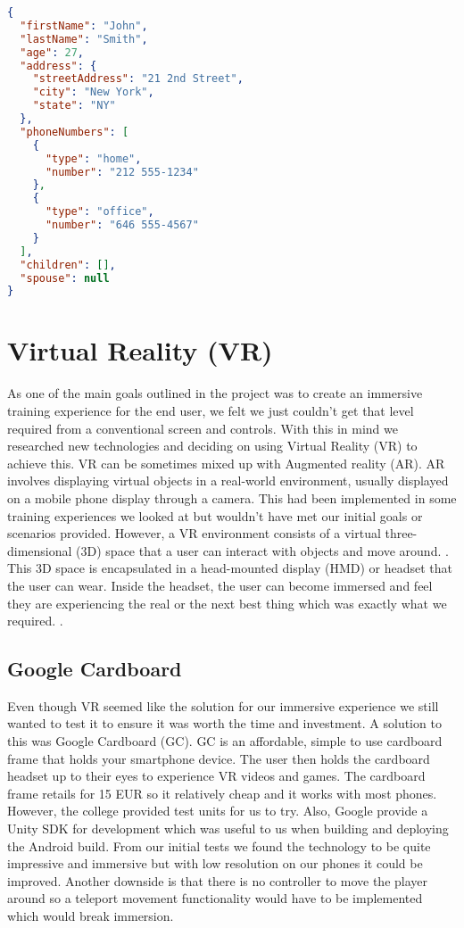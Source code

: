 \begin{lstlisting}[language=JSON]
{
  "firstName": "John",
  "lastName": "Smith",
  "age": 27,
  "address": {
    "streetAddress": "21 2nd Street",
    "city": "New York",
    "state": "NY"
  },
  "phoneNumbers": [
    {
      "type": "home",
      "number": "212 555-1234"
    },
    {
      "type": "office",
      "number": "646 555-4567"
    }
  ],
  "children": [],
  "spouse": null
}
\end{lstlisting}

\section{Virtual Reality (VR)}
As one of the main goals outlined in the project was to create an immersive training experience for the end user, we felt we just couldn't get that level required from a conventional screen and controls. With this in mind we researched new technologies and deciding on using Virtual Reality (VR) to achieve this. VR can be sometimes mixed up with Augmented reality (AR). AR involves displaying virtual objects in a real-world environment, usually displayed on a mobile phone display through a camera. This had been implemented in some training experiences we looked at but wouldn't have met our initial goals or scenarios provided. However, a VR environment consists of a virtual three-dimensional (3D) space that a user can interact with objects and move around. \cite{isdale1998virtual}. This 3D space is encapsulated in a head-mounted display (HMD) or headset that the user can wear. Inside the headset, the user can become immersed and feel they are experiencing the real or the next best thing which was exactly what we required. \cite{isdale1998virtual}. 

\subsection{Google Cardboard}
Even though VR seemed like the solution for our immersive experience we still wanted to test it to ensure it was worth the time and investment. A solution to this was Google Cardboard (GC). GC is an affordable, simple to use cardboard frame that holds your smartphone device. The user then holds the cardboard headset up to their eyes to experience VR videos and games. The cardboard frame retails for 15 EUR so it relatively cheap and it works with most phones. However, the college provided test units for us to try. Also, Google provide a Unity SDK for development which was useful to us when building and deploying the Android build. From our initial tests we found the technology to be quite impressive and immersive but with low resolution on our phones it could be improved. Another downside is that there is no controller to move the player around so a teleport movement functionality would have to be implemented which would break immersion.

